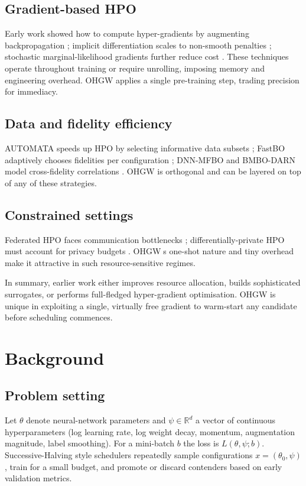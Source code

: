 \documentclass{article}
\begin{document}
\subsection{Gradient-based HPO}
Early work showed how to compute hyper-gradients by augmenting backpropagation \cite{chandra-2019-gradient}; implicit differentiation scales to non-smooth penalties \cite{bertrand-2020-implicit}; stochastic marginal-likelihood gradients further reduce cost \cite{immer-2023-stochastic}. These techniques operate throughout training or require unrolling, imposing memory and engineering overhead. OHGW applies a single pre-training step, trading precision for immediacy.

\subsection{Data and fidelity efficiency}
AUTOMATA speeds up HPO by selecting informative data subsets \cite{killamsetty-2022-automata}; FastBO adaptively chooses fidelities per configuration \cite{jiang-2024-efficient}; DNN-MFBO and BMBO-DARN model cross-fidelity correlations \cite{li-2020-multi,li-2021-batch}. OHGW is orthogonal and can be layered on top of any of these strategies.

\subsection{Constrained settings}
Federated HPO faces communication bottlenecks \cite{khodak-2021-federated}; differentially-private HPO must account for privacy budgets \cite{panda-2022-new,wang-2023-hypo}. OHGWs one-shot nature and tiny overhead make it attractive in such resource-sensitive regimes.

In summary, earlier work either improves resource allocation, builds sophisticated surrogates, or performs full-fledged hyper-gradient optimisation. OHGW is unique in exploiting a single, virtually free gradient to warm-start any candidate before scheduling commences.

\section{Background}
\subsection{Problem setting}
Let \(\theta\) denote neural-network parameters and \(\psi\in\mathbb{R}^d\) a vector of continuous hyperparameters (log learning rate, log weight decay, momentum, augmentation magnitude, label smoothing). For a mini-batch \(b\) the loss is \(L(\theta,\psi; b)\). Successive-Halving style schedulers repeatedly sample configurations \(x=(\theta_0,\psi)\), train for a small budget, and promote or discard contenders based on early validation metrics.
\end{document}
